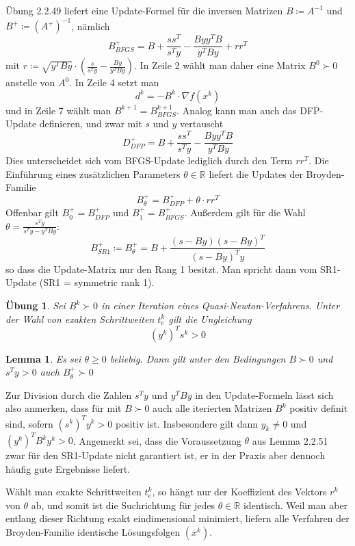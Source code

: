 \documentclass[11pt]{scrreprt}
\newcounter{thm}
\theoremstyle{thmstyle}
\numberwithin{thm}{section}
\newtheorem{lemma}[thm]{Lemma}
\newtheorem{uebung}[thm]{Übung}
\begin{document}
Übung 2.2.49 liefert eine Update-Formel für die inversen Matrizen $B \coloneqq A^{-1}$ und $B^+ \coloneqq (A^+)^{-1}$, nämlich
	$$ B_{BFGS}^+ = B + \frac{s s^T}{s^T y} - \frac{By y^T B}{y^T B y} + r r^T $$
	mit $r \coloneqq \sqrt{y^T B y} \cdot \left( \frac{s}{s^T y} - \frac{B y}{y^T B y} \right)$. In Zeile 2 wählt man daher eine Matrix $B^0 \succ 0$ anstelle von $A^0$. In Zeile 4 setzt man
		$$ d^k = -B^k \cdot \nabla f(x^k) $$
		und in Zeile 7 wählt man $B^{k+1} = B_{BFGS}^{k+1}$. Analog kann man auch das DFP-Update definieren, und zwar mit $s$ und $y$ vertauscht
		$$ D_{DFP}^+ = B + \frac{s s^T}{s^T y} - \frac{B y y^T B}{y^T B y} $$
		Dies unterscheidet sich vom BFGS-Update lediglich durch den Term $r r^T$. Die Einführung eines zusätzlichen Parameters $\theta \in \mathbb{R}$ liefert die Updates der Broyden-Familie
		$$ B_{\theta}^+ = B_{DFP}^+ + \theta \cdot r r^T $$
		Offenbar gilt $B_0^+ = B_{DFP}^+$ und $B_1^+ = B_{BFGS}^+$. Außerdem gilt für die Wahl $\theta = \frac{s^T y}{s^T y - y^T B y}$:
		$$ B_{SR1}^+ \coloneqq B_{\theta}^+ = B + \frac{(s- By) (s - By)^T}{(s - By)^T y} $$
		so dass die Update-Matrix nur den Rang 1 besitzt. Man spricht dann vom SR1-Update (SR1 = symmetric rank 1).
		
\begin{uebung}
	Sei $B^k \succ 0$ in einer Iteration eines Quasi-Newton-Verfahrens. Unter der Wahl von exakten Schrittweiten $t^k_e$ gilt die Ungleichung
	$$ (y^k)^T s^k > 0 $$
\end{uebung}	

\begin{lemma}
	Es sei $\theta \geq 0$ beliebig. Dann gilt unter den Bedingungen $B \succ 0$ und $s^T y > 0$ auch $B_{\theta}^+ \succ 0$
\end{lemma}

Zur Division durch die Zahlen $s^T y$ und $y^T B y$ in den Update-Formeln lässt sich also anmerken, dass für mit $B \succ 0$ auch alle iterierten Matrizen $B^k$ positiv definit sind, sofern $(s^k)^T y^k > 0$ positiv ist. Insbesondere gilt dann $y_k \neq 0$ und $(y^k)^T B^k y^k > 0$. Angemerkt sei, dass die Voraussetzung $\theta$ aus Lemma 2.2.51 zwar für den SR1-Update nicht garantiert ist, er in der Praxis aber dennoch häufig gute Ergebnisse liefert. ~\bigskip

Wählt man exakte Schrittweiten $t_e^k$, so hängt nur der Koeffizient des Vektors $r^k$ von $\theta$ ab, und somit ist die Suchrichtung für jedes $\theta \in \mathbb{R}$ identisch. Weil man aber entlang dieser Richtung exakt eindimensional minimiert, liefern alle Verfahren der Broyden-Familie identische Lösungsfolgen $(x^k)$. ~\bigskip
\end{document}

